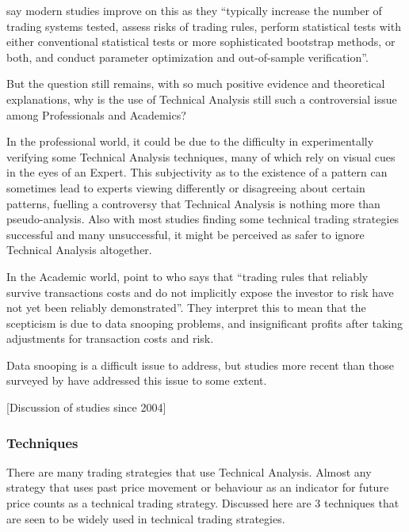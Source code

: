 \documentclass{article}
\theoremstyle{definition}
\begin{document}
\cite{taprofitability} say modern studies improve on this as they ``typically
increase the number of trading systems tested, assess risks of trading rules,
perform statistical tests with either conventional statistical tests or more sophisticated bootstrap methods, or both, and conduct parameter optimization and out-of-sample verification''.

But the question still remains, with so much positive evidence and theoretical explanations, why is the use of Technical Analysis still such a controversial issue among Professionals and Academics? 

In the professional world, it could be due to the difficulty in experimentally verifying some Technical Analysis techniques, many of which rely on visual cues in the eyes of an Expert. This subjectivity as to the existence of a pattern can sometimes lead to experts viewing differently or disagreeing about certain patterns, fuelling a controversy that Technical Analysis is nothing more than pseudo-analysis. Also with most studies finding some technical trading strategies successful and many unsuccessful, it might be perceived as safer to ignore Technical Analysis altogether.

In the Academic world, \cite{taprofitability} point to \cite{assetpricing} who says that ``trading rules that reliably survive transactions costs and do not implicitly expose the investor to risk have not yet been reliably demonstrated''. They interpret this to mean that the scepticism is due to data snooping problems, and insignificant profits after taking adjustments for transaction costs and risk.

Data snooping is a difficult issue to address, but studies more recent than those surveyed by \cite{taprofitability} have addressed this issue to some extent.

[Discussion of studies since 2004]

\subsubsection{Techniques}

There are many trading strategies that use Technical Analysis. Almost any strategy that uses past price movement or behaviour as an indicator for future price counts as a technical trading strategy. Discussed here are 3 techniques that are seen to be widely used in technical trading strategies.
\end{document}
